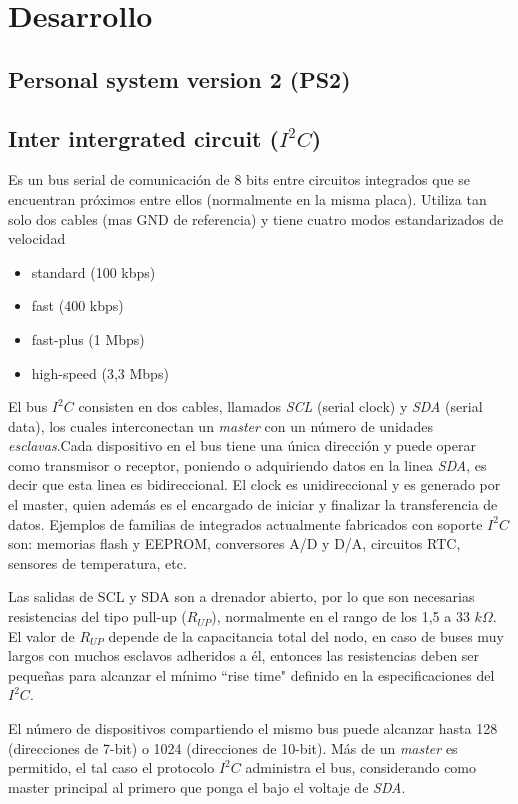 \documentclass[11pt, a4paper]{article}
\begin{document}
\section{Desarrollo}
	\subsection{Personal system version 2 (PS2)}


	\subsection{Inter intergrated circuit ($I^{2}C$)}
		Es un bus serial de comunicación de 8 bits entre circuitos integrados que se encuentran próximos entre ellos (normalmente en la misma placa). Utiliza tan solo dos cables (mas GND de referencia) y tiene cuatro modos estandarizados de velocidad
		\begin{itemize} \itemsep0em
			\item standard (100 kbps)
			\item fast (400 kbps)
			\item fast-plus (1 Mbps)
			\item high-speed (3,3 Mbps)
		\end{itemize}

		El bus $I^{2}C$ consisten en dos cables, llamados \textit{SCL} (serial clock) y \textit{SDA} (serial data), los cuales interconectan un \textit{master} con un número de unidades \textit{esclavas}.Cada dispositivo en el bus tiene una única dirección y puede operar como transmisor o receptor, poniendo o adquiriendo datos en la linea \textit{SDA}, es decir que esta linea es bidireccional. El clock es unidireccional y es generado por el master, quien además es el encargado de iniciar y finalizar la transferencia de datos. Ejemplos de familias de integrados actualmente fabricados con soporte $I^{2}C$ son: memorias flash y EEPROM, conversores A/D y D/A, circuitos RTC, sensores de temperatura, etc.
		
		Las salidas de SCL y SDA son a  drenador abierto, por lo que son necesarias resistencias del tipo pull-up ($R_{UP}$), normalmente en el rango de los 1,5 a 33 $k\Omega$. El valor de $R_{UP}$ depende de la capacitancia total del nodo, en caso de buses muy largos con muchos esclavos adheridos a él, entonces las resistencias deben ser pequeñas para alcanzar el mínimo ``rise time" definido en la especificaciones del $I^{2}C$.

		El número de dispositivos compartiendo el mismo bus puede alcanzar hasta 128 (direcciones de 7-bit) o 1024 (direcciones de 10-bit). Más de un \textit{master} es permitido, el tal caso el protocolo $I^{2}C$ administra el bus, considerando como master principal al primero que ponga el bajo el voltaje de \textit{SDA}.
\end{document}
